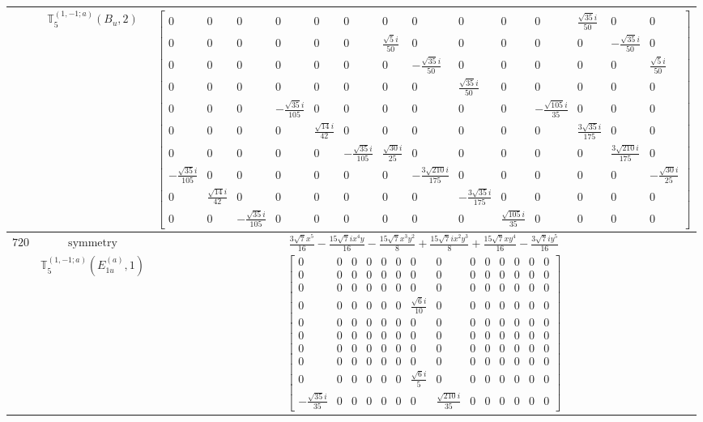 \documentclass[fleqn,8pt,landscape]{jsarticle}
\begin{document}
\begin{longtable}{ccc}
$  $ & $ \mathbb{T}_{5}^{(1,-1;a)}(B_{u},2) $ & $ \begin{bmatrix} 0 & 0 & 0 & 0 & 0 & 0 & 0 & 0 & 0 & 0 & 0 & \frac{\sqrt{35} i}{50} & 0 & 0 \\ 0 & 0 & 0 & 0 & 0 & 0 & \frac{\sqrt{5} i}{50} & 0 & 0 & 0 & 0 & 0 & - \frac{\sqrt{35} i}{50} & 0 \\ 0 & 0 & 0 & 0 & 0 & 0 & 0 & - \frac{\sqrt{35} i}{50} & 0 & 0 & 0 & 0 & 0 & \frac{\sqrt{5} i}{50} \\ 0 & 0 & 0 & 0 & 0 & 0 & 0 & 0 & \frac{\sqrt{35} i}{50} & 0 & 0 & 0 & 0 & 0 \\ 0 & 0 & 0 & - \frac{\sqrt{35} i}{105} & 0 & 0 & 0 & 0 & 0 & 0 & - \frac{\sqrt{105} i}{35} & 0 & 0 & 0 \\ 0 & 0 & 0 & 0 & \frac{\sqrt{14} i}{42} & 0 & 0 & 0 & 0 & 0 & 0 & \frac{3 \sqrt{35} i}{175} & 0 & 0 \\ 0 & 0 & 0 & 0 & 0 & - \frac{\sqrt{35} i}{105} & \frac{\sqrt{30} i}{25} & 0 & 0 & 0 & 0 & 0 & \frac{3 \sqrt{210} i}{175} & 0 \\ - \frac{\sqrt{35} i}{105} & 0 & 0 & 0 & 0 & 0 & 0 & - \frac{3 \sqrt{210} i}{175} & 0 & 0 & 0 & 0 & 0 & - \frac{\sqrt{30} i}{25} \\ 0 & \frac{\sqrt{14} i}{42} & 0 & 0 & 0 & 0 & 0 & 0 & - \frac{3 \sqrt{35} i}{175} & 0 & 0 & 0 & 0 & 0 \\ 0 & 0 & - \frac{\sqrt{35} i}{105} & 0 & 0 & 0 & 0 & 0 & 0 & \frac{\sqrt{105} i}{35} & 0 & 0 & 0 & 0 \end{bmatrix} $ \\ \hline
$ 720 $ & $ \text{symmetry} $ & $ \frac{3 \sqrt{7} x^{5}}{16} - \frac{15 \sqrt{7} i x^{4} y}{16} - \frac{15 \sqrt{7} x^{3} y^{2}}{8} + \frac{15 \sqrt{7} i x^{2} y^{3}}{8} + \frac{15 \sqrt{7} x y^{4}}{16} - \frac{3 \sqrt{7} i y^{5}}{16} $ \\
$  $ & $ \mathbb{T}_{5}^{(1,-1;a)}(E_{1u}^{(a)},1) $ & $ \begin{bmatrix} 0 & 0 & 0 & 0 & 0 & 0 & 0 & 0 & 0 & 0 & 0 & 0 & 0 & 0 \\ 0 & 0 & 0 & 0 & 0 & 0 & 0 & 0 & 0 & 0 & 0 & 0 & 0 & 0 \\ 0 & 0 & 0 & 0 & 0 & 0 & 0 & 0 & 0 & 0 & 0 & 0 & 0 & 0 \\ 0 & 0 & 0 & 0 & 0 & 0 & \frac{\sqrt{6} i}{10} & 0 & 0 & 0 & 0 & 0 & 0 & 0 \\ 0 & 0 & 0 & 0 & 0 & 0 & 0 & 0 & 0 & 0 & 0 & 0 & 0 & 0 \\ 0 & 0 & 0 & 0 & 0 & 0 & 0 & 0 & 0 & 0 & 0 & 0 & 0 & 0 \\ 0 & 0 & 0 & 0 & 0 & 0 & 0 & 0 & 0 & 0 & 0 & 0 & 0 & 0 \\ 0 & 0 & 0 & 0 & 0 & 0 & 0 & 0 & 0 & 0 & 0 & 0 & 0 & 0 \\ 0 & 0 & 0 & 0 & 0 & 0 & \frac{\sqrt{6} i}{5} & 0 & 0 & 0 & 0 & 0 & 0 & 0 \\ - \frac{\sqrt{35} i}{35} & 0 & 0 & 0 & 0 & 0 & 0 & \frac{\sqrt{210} i}{35} & 0 & 0 & 0 & 0 & 0 & 0 \end{bmatrix} $ \\ \hline

\end{longtable}
\end{document}
